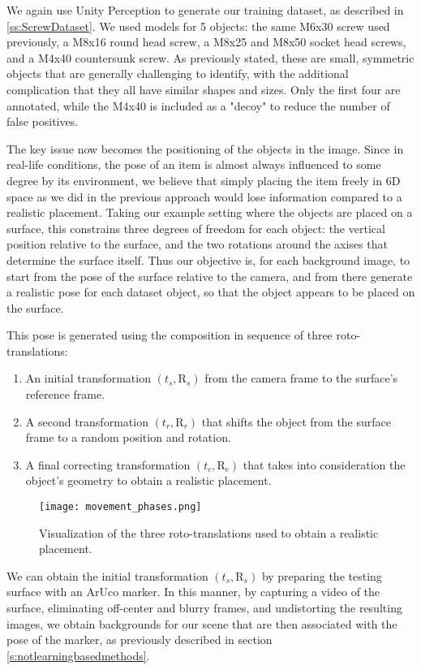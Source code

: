We again use Unity Perception to generate our training dataset, as described in \ref{ss:ScrewDataset}. We used models for 5 objects: the same M6x30 screw used previously, a M8x16 round head screw, a M8x25 and M8x50 socket head screws, and a M4x40 countersunk screw. As previously stated, these are small, symmetric objects that are generally challenging to identify, with the additional complication that they all have similar shapes and sizes. Only the first four are annotated, while the M4x40 is included as a "decoy" to reduce the number of false positives.

The key issue now becomes the positioning of the objects in the image. Since in real-life conditions, the pose of an item is almost always influenced to some degree by its environment, we believe that simply placing the item freely in 6D space as we did in the previous approach would lose information compared to a realistic placement. Taking our example setting where the objects are placed on a surface, this constrains three degrees of freedom for each object: the vertical position relative to the surface, and the two rotations around the axises that determine the surface itself. Thus our objective is, for each background image, to start from the pose of the surface relative to the camera, and from there generate a realistic pose for each dataset object, so that the object appears to be placed on the surface.

This pose is generated using the composition in sequence of three roto-translations:

\begin{enumerate}
    \item An initial transformation $(t_s, \text{R}_s)$ from the camera frame to the surface's reference frame.
    \item A second transformation $(t_r, \text{R}_r)$ that shifts the object from the surface frame to a random position and rotation.
    \item A final correcting transformation $(t_c, \text{R}_c)$ that takes into consideration the object's geometry to obtain a realistic placement.
\end{enumerate}

\begin{figure}[ht]
    \texttt{[image: movement\_phases.png]}
    \caption{Visualization of the three roto-translations used to obtain a realistic placement.}
\end{figure}

We can obtain the initial transformation $(t_s, \text{R}_s)$ by preparing the testing surface with an ArUco marker. In this manner, by capturing a video of the surface, eliminating off-center and blurry frames, and undistorting the resulting images, we obtain backgrounds for our scene that are then associated with the pose of the marker, as previously described in section \ref*{s:notlearningbasedmethods}.

